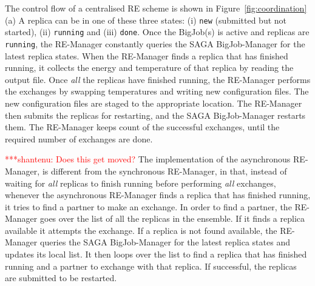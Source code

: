 \documentclass{rspublic}
\newcommand{\jhanote}[1]{ {\textcolor{red} { ***shantenu: #1 }}}
\newcommand{\alnote}[1]{ {\textcolor{blue} { ***andre: #1 }}}
\newcommand{\alnote}[1]{}
\newcommand{\jhanote}[1]{}
\begin{document}

The control flow of a centralised RE scheme is shown in
Figure~\ref{fig:coordination}(a) %
A replica can be in one of these three states:
(i) \texttt{new} (submitted but not started), (ii) \texttt{running}
and (iii) \texttt{done}.  Once the BigJob(s) is active and replicas
are \texttt{running}, the RE-Manager constantly queries the SAGA
BigJob-Manager for the latest replica states.  When the RE-Manager
finds a replica that has finished running, it collects the energy and
temperature of that replica by reading the output file. Once
\emph{all} the replicas have finished running, the RE-Manager performs
the exchanges by swapping temperatures and writing new configuration
files. The new configuration files are staged to the appropriate
location. The RE-Manager then submits the replicas for restarting, and
the SAGA BigJob-Manager restarts them. The RE-Manager keeps count of
the successful exchanges, until the required number of exchanges are
done.

\jhanote{Does this get moved?} The implementation of the asynchronous
RE-Manager, is different from the synchronous RE-Manager, in that,
instead of waiting for \emph{all} replicas to finish running before
performing \emph{all} exchanges, whenever the asynchronous RE-Manager
finds a replica that has finished running, it tries to find a partner
to make an exchange. In order to find a partner, the RE-Manager goes
over the list of all the replicas in the ensemble. If it finds a
replica available it attempts the exchange. If a replica is not found
available, the RE-Manager queries the SAGA BigJob-Manager for the
latest replica states and updates its local list. It then loops over
the list to find a replica that has finished running and a partner to
exchange with that replica.  If successful, the replicas are submitted
to be restarted. %


\end{document}
